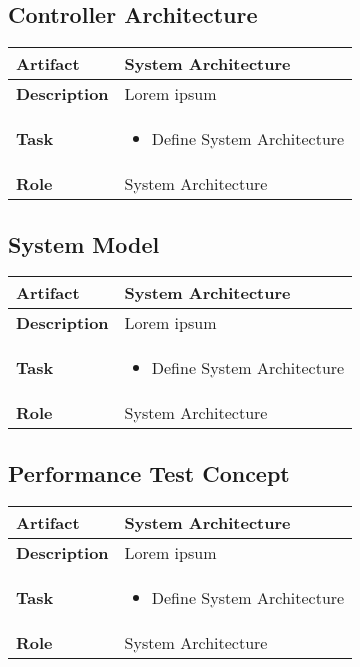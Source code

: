 \subsection{Controller Architecture}
 \label{table:ch6_Role_Service_Developer}
\begin{tabular}
	{|m{2cm}|m{10cm}|} \hline \bfseries Artifact & System Architecture\\
	\hline \bfseries Description & Lorem ipsum\\
	\hline \bfseries Task & 
	\begin{itemize}
		\item Define System Architecture 
	\end{itemize}
	\\
	\hline \bfseries Role & System Architecture\\
	\hline 
\end{tabular}

\subsection{System Model}
 \label{table:ch6_Role_Service_Developer}
\begin{tabular}
	{|m{2cm}|m{10cm}|} \hline \bfseries Artifact & System Architecture\\
	\hline \bfseries Description & Lorem ipsum\\
	\hline \bfseries Task & 
	\begin{itemize}
		\item Define System Architecture 
	\end{itemize}
	\\
	\hline \bfseries Role & System Architecture\\
	\hline 
\end{tabular}

\subsection{Performance Test Concept}
 \label{table:ch6_Role_Service_Developer}
\begin{tabular}
	{|m{2cm}|m{10cm}|} \hline \bfseries Artifact & System Architecture\\
	\hline \bfseries Description & Lorem ipsum\\
	\hline \bfseries Task & 
	\begin{itemize}
		\item Define System Architecture 
	\end{itemize}
	\\
	\hline \bfseries Role & System Architecture\\
	\hline 
\end{tabular}

